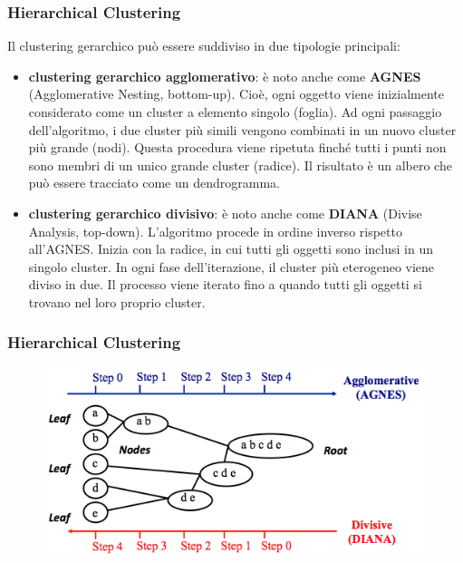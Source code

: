 \begin{frame}

	\frametitle{{\color{GradientDescentDiagramGreen}Hierarchical Clustering}}

		Il clustering gerarchico può essere suddiviso in due tipologie principali:
		\begin{itemize}
			\item \textbf{clustering gerarchico agglomerativo}: è noto anche come \textbf{AGNES} (Agglomerative Nesting, bottom-up). Cioè, ogni oggetto viene inizialmente considerato come un cluster a elemento singolo (foglia). Ad ogni passaggio dell'algoritmo, i due cluster più simili vengono combinati in un nuovo cluster più grande (nodi). Questa procedura viene ripetuta finché tutti i punti non sono membri di un unico grande cluster (radice). Il risultato è un albero che può essere tracciato come un dendrogramma.
			\item \textbf{clustering gerarchico divisivo}: è noto anche come \textbf{DIANA} (Divise Analysis, top-down). L'algoritmo procede in ordine inverso rispetto all'AGNES. Inizia con la radice, in cui tutti gli oggetti sono inclusi in un singolo cluster. In ogni fase dell'iterazione, il cluster più eterogeneo viene diviso in due. Il processo viene iterato fino a quando tutti gli oggetti si trovano nel loro proprio cluster.
		\end{itemize}
\end{frame}


\begin{frame}

	\frametitle{{\color{GradientDescentDiagramGreen}Hierarchical Clustering}}

		\begin{figure}[!htbp]
			\centering
			\includegraphics[width=12.0cm]{images/unsupervised/hierarchical/hierarchical-clustering-agnes-diana.png}
		\end{figure}

\end{frame}




